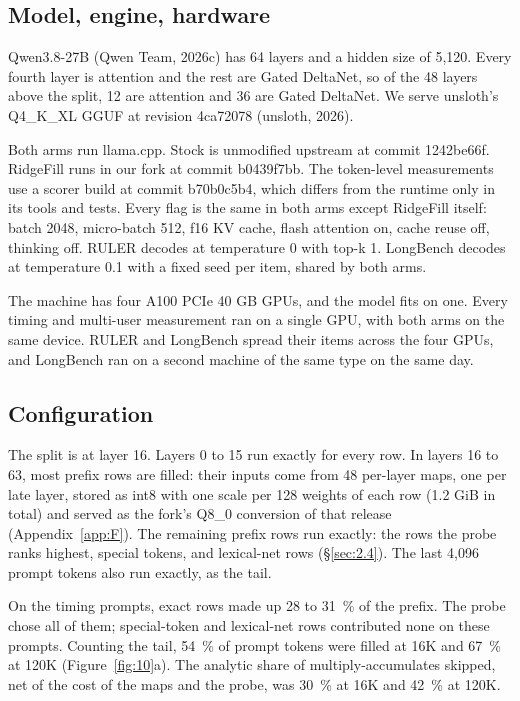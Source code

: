 \documentclass[11pt]{article}
\begin{document}
\subsection{Model, engine, hardware}\label{sec:4.1}
Qwen3.8-27B (Qwen Team, 2026c) has 64 layers and a hidden size of 5,120. Every fourth layer is attention and the rest are Gated DeltaNet, so of the 48 layers above the split, 12 are attention and 36 are Gated DeltaNet. We serve unsloth's Q4\_K\_XL GGUF at revision 4ca72078 (unsloth, 2026).

Both arms run llama.cpp. Stock is unmodified upstream at commit 1242be66f. RidgeFill runs in our fork at commit b0439f7bb. The token-level measurements use a scorer build at commit b70b0c5b4, which differs from the runtime only in its tools and tests. Every flag is the same in both arms except RidgeFill itself: batch 2048, micro-batch 512, f16 KV cache, flash attention on, cache reuse off, thinking off. RULER decodes at temperature 0 with top-k 1. LongBench decodes at temperature 0.1 with a fixed seed per item, shared by both arms.

The machine has four A100 PCIe 40 GB GPUs, and the model fits on one. Every timing and multi-user measurement ran on a single GPU, with both arms on the same device. RULER and LongBench spread their items across the four GPUs, and LongBench ran on a second machine of the same type on the same day.


\subsection{Configuration}\label{sec:4.2}
The split is at layer 16. Layers 0 to 15 run exactly for every row. In layers 16 to 63, most prefix rows are filled: their inputs come from 48 per-layer maps, one per late layer, stored as int8 with one scale per 128 weights of each row (1.2 GiB in total) and served as the fork's Q8\_0 conversion of that release (Appendix~\ref{app:F}). The remaining prefix rows run exactly: the rows the probe ranks highest, special tokens, and lexical-net rows (\S\ref{sec:2.4}). The last 4,096 prompt tokens also run exactly, as the tail.

On the timing prompts, exact rows made up 28 to 31~\% of the prefix. The probe chose all of them; special-token and lexical-net rows contributed none on these prompts. Counting the tail, 54~\% of prompt tokens were filled at 16K and 67~\% at 120K (Figure~\ref{fig:10}a). The analytic share of multiply-accumulates skipped, net of the cost of the maps and the probe, was 30~\% at 16K and 42~\% at 120K.
\end{document}
